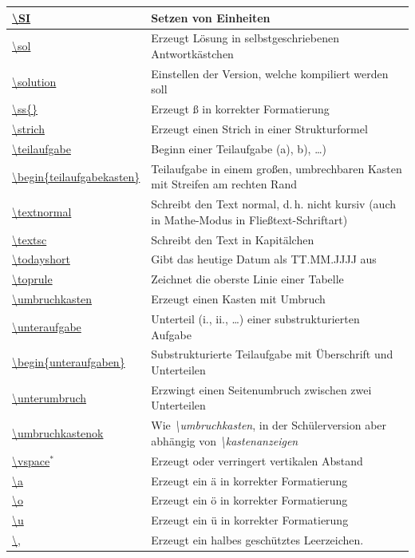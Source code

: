 \documentclass[../main.tex]{subfiles}
\begin{document}
\begin{tabularx}{\textwidth}{|l|X|}
    \hyperlink{SI}{\textbackslash{}SI}&Setzen von Einheiten\\\hline
    \hyperlink{sol}{\textbackslash{}sol}&Erzeugt L\"osung in selbstgeschriebenen Antwortk\"astchen\\\hline
    \hyperlink{solution}{\textbackslash{}solution}&Einstellen der Version, welche kompiliert werden soll\\\hline
    \hyperlink{ss}{\textbackslash{}ss\{\}}&Erzeugt \ss{} in korrekter Formatierung\\\hline
    \hyperlink{strich}{\textbackslash{}strich}&Erzeugt einen Strich in einer Strukturformel\\\hline
    \hyperlink{teilaufgabe}{\textbackslash{}teilaufgabe}&Beginn einer Teilaufgabe (a), b), \dots)\\\hline
    \hyperlink{teilaufgabekasten}{\textbackslash begin\{teilaufgabekasten\}}&Teilaufgabe in einem gro\ss{}en, umbrechbaren Kasten mit Streifen am rechten Rand\\\hline
    \hyperlink{textnormal}{\textbackslash{}textnormal}&Schreibt den Text normal, d.\,h. nicht kursiv (auch in Mathe-Modus in Flie\ss{}text-Schriftart)\\\hline
    \hyperlink{textsc}{\textbackslash{}textsc}&Schreibt den Text in Kapit\"alchen\\\hline
    \hyperlink{todayshort}{\textbackslash{}todayshort}&Gibt das heutige Datum als TT.MM.JJJJ aus\\\hline
    \hyperlink{toprule}{\textbackslash{}toprule}&Zeichnet die oberste Linie einer Tabelle\\\hline
    \hyperlink{umbruchkasten}{\textbackslash{}umbruchkasten}&Erzeugt einen Kasten mit Umbruch\\\hline
    \hyperlink{unteraufgabe}{\textbackslash{}unteraufgabe}&Unterteil (i., ii., \dots) einer substrukturierten Aufgabe\\\hline
    \hyperlink{unteraufgaben}{\textbackslash begin\{unteraufgaben\}}&Substrukturierte Teilaufgabe mit \"Uberschrift und Unterteilen\\\hline
    \hyperlink{unterumbruch}{\textbackslash{}unterumbruch}&Erzwingt einen Seitenumbruch zwischen zwei Unterteilen\\\hline
    \hyperlink{umbruchkastenok}{\textbackslash{}umbruchkastenok}&Wie \textit{\textbackslash umbruchkasten}, in der Sch\"ulerversion aber abh\"angig von \textit{\textbackslash kastenanzeigen}\\\hline
    \hyperlink{vspace}{\textbackslash vspace$^*$}&Erzeugt oder verringert vertikalen Abstand\\\hline
    \hyperlink{a}{\textbackslash{}\grqq{}a}&Erzeugt ein \"a in korrekter Formatierung\\\hline
    \hyperlink{o}{\textbackslash{}\grqq{}o}&Erzeugt ein \"o in korrekter Formatierung\\\hline
    \hyperlink{u}{\textbackslash{}\grqq{}u}&Erzeugt ein \"u in korrekter Formatierung\\\hline
    \hyperlink{,}{\textbackslash{},}&Erzeugt ein halbes gesch\"utztes Leerzeichen.\\\hline
\end{tabularx}
\end{document}
